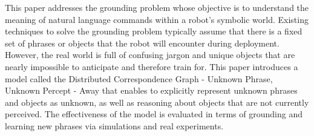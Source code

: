 This paper addresses the grounding problem whose objective is to understand the meaning of natural language commands within a robot's symbolic world. Existing techniques to solve the grounding problem typically assume that there is a fixed set of phrases or objects that the robot will encounter during deployment. However, the real world is full of confusing jargon and unique objects that are nearly impossible to anticipate and therefore train for. This paper introduces a model called the Distributed Correspondence Graph - Unknown Phrase, Unknown Percept - Away that enables to explicitly represent unknown phrases and objects as unknown, as well as reasoning about objects that are not currently perceived. The effectiveness of the model is evaluated in terms of grounding and learning new phrases via simulations and real experiments.



